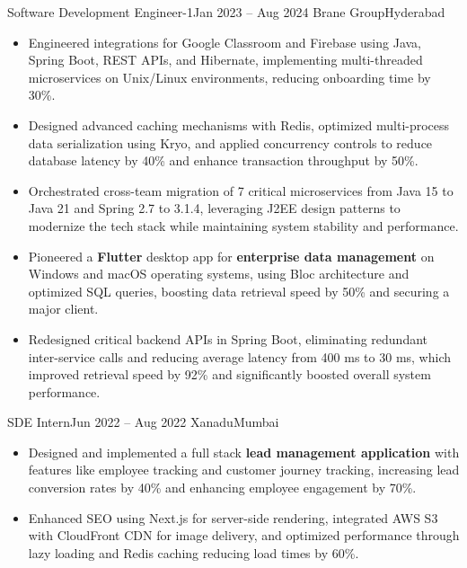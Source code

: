 \documentclass[calibri,10pt]{fed-res}
\begin{document}
\resumeSubheading
  {Software Development Engineer-1}{Jan 2023 -- Aug 2024}
  {Brane Group}{Hyderabad}
\begin{itemize}[leftmargin=15pt,itemsep=1pt,parsep=0pt,topsep=3pt,partopsep=0pt]
\item Engineered integrations for Google Classroom and Firebase using Java, Spring Boot, REST APIs, and Hibernate, implementing multi-threaded microservices on Unix/Linux environments, reducing onboarding time by 30\%.
\item Designed advanced caching mechanisms with Redis, optimized multi-process data serialization using Kryo, and applied concurrency controls to reduce database latency by 40\% and enhance transaction throughput by 50\%.
\item Orchestrated cross-team migration of 7 critical microservices from Java 15 to Java 21 and Spring 2.7 to 3.1.4, leveraging J2EE design patterns to modernize the tech stack while maintaining system stability and performance.
\item Pioneered a \textbf{Flutter} desktop app for \textbf{enterprise data management} on Windows and macOS operating systems, using Bloc architecture and optimized SQL queries, boosting data retrieval speed by 50\% and securing a major client.
\item Redesigned critical backend APIs in Spring Boot, eliminating redundant inter-service calls and reducing average latency from 400 ms to 30 ms, which improved retrieval speed by 92\% and significantly boosted overall system performance.
\end{itemize}

\vspace{-4pt}
\resumeSubheading
  {SDE Intern}{Jun 2022 -- Aug 2022}
  {Xanadu}{Mumbai}
\begin{itemize}[leftmargin=15pt,itemsep=2pt,parsep=0pt,topsep=5pt,partopsep=0pt]
 \item Designed and implemented a full stack \textbf{lead management application} with features like employee tracking and customer journey tracking, increasing lead conversion rates by 40\% and enhancing employee engagement by 70\%.
\item Enhanced SEO using Next.js for server-side rendering, integrated AWS S3 with CloudFront CDN for image delivery, and optimized performance through lazy loading and Redis caching reducing load times by 60\%.
\end{itemize}
\end{document}
